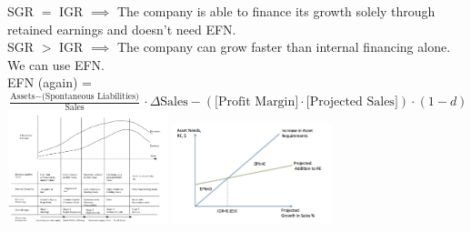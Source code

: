 \documentclass{letter}
\begin{document}
SGR $=$ IGR $\implies$ The company is able to finance its growth solely through retained earnings and doesn't need EFN. \\
SGR $>$ IGR $\implies$ The company can grow faster than internal financing alone. We can use EFN. \\
EFN (again) = $\frac{\text{Assets} - \text{(Spontaneous Liabilities)}}{\text{Sales}} \cdot \Delta \text{Sales} - (\text{[Profit Margin]} \cdot \text{[Projected Sales]}) \cdot (1 - d)$
\newline
\includegraphics[width=0.35\textwidth]{./planning.png}
\hfill
\includegraphics[width=0.35\textwidth]{./efn.png}
\end{document}
